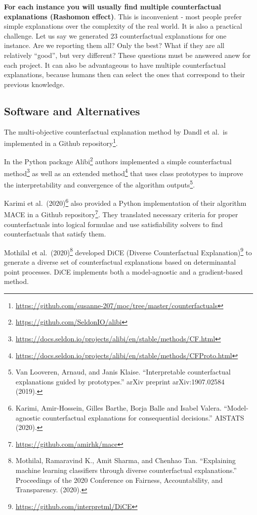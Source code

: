 \documentclass[
  11pt,
]{scrbook}
\renewcommand{\href}[2]{#2\footnote{\url{#1}}}
\begin{document}
\textbf{For each instance you will usually find multiple counterfactual explanations (Rashomon effect)}.
This is inconvenient - most people prefer simple explanations over the complexity of the real world.
It is also a practical challenge.
Let us say we generated 23 counterfactual explanations for one instance.
Are we reporting them all?
Only the best?
What if they are all relatively ``good'', but very different?
These questions must be answered anew for each project.
It can also be advantageous to have multiple counterfactual explanations, because humans then can select the ones that correspond to their previous knowledge.

\hypertarget{example-software}{%
\subsection{Software and Alternatives}\label{example-software}}

The multi-objective counterfactual explanation method by Dandl et al.~is implemented in a \href{https://github.com/susanne-207/moc/tree/master/counterfactuals}{Github repository}.

In the Python package \href{https://github.com/SeldonIO/alibi}{Alibi} authors implemented a \href{https://docs.seldon.io/projects/alibi/en/stable/methods/CF.html}{simple counterfactual method} as well as an \href{https://docs.seldon.io/projects/alibi/en/stable/methods/CFProto.html}{extended method} that uses class prototypes to improve the interpretability and convergence of the algorithm outputs\footnote{Van Looveren, Arnaud, and Janis Klaise. ``Interpretable counterfactual explanations guided by prototypes.'' arXiv preprint arXiv:1907.02584 (2019).}.

Karimi et al.~(2020)\footnote{Karimi, Amir-Hossein, Gilles Barthe, Borja Balle and Isabel Valera. ``Model-agnostic counterfactual explanations for consequential decisions.'' AISTATS (2020).} also provided a Python implementation of their algorithm MACE in a \href{https://github.com/amirhk/mace}{Github repository}.
They translated necessary criteria for proper counterfactuals into logical formulae and use satisfiability solvers to find counterfactuals that satisfy them.

Mothilal et al.~(2020)\footnote{Mothilal, Ramaravind K., Amit Sharma, and Chenhao Tan. ``Explaining machine learning classifiers through diverse counterfactual explanations.'' Proceedings of the 2020 Conference on Fairness, Accountability, and Transparency. (2020).} developed \href{https://github.com/interpretml/DiCE}{DiCE (Diverse Counterfactual Explanation)} to generate a diverse set of counterfactual explanations based on determinantal point processes.
DiCE implements both a model-agnostic and a gradient-based method.
\end{document}

